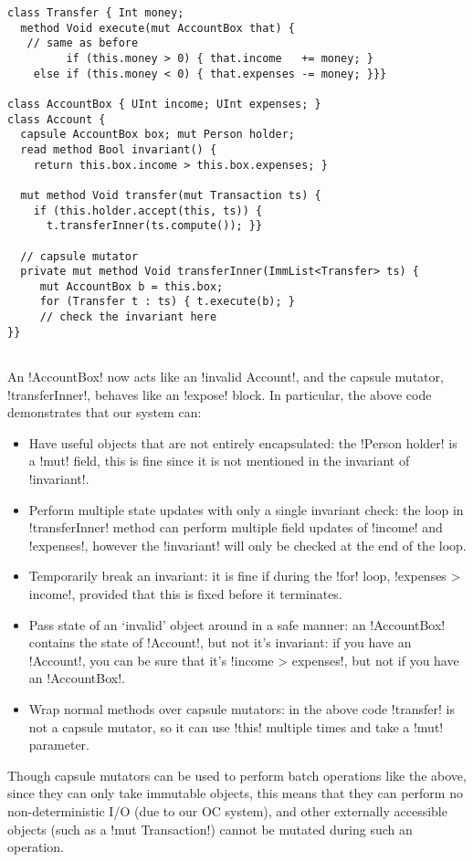 \begin{lstlisting}
class Transfer { Int money;
  method Void execute(mut AccountBox that) {
   // same as before
         if (this.money > 0) { that.income   += money; }
    else if (this.money < 0) { that.expenses -= money; }}}

class AccountBox { UInt income; UInt expenses; }
class Account {
  capsule AccountBox box; mut Person holder;
  read method Bool invariant() {
    return this.box.income > this.box.expenses; }
    
  mut method Void transfer(mut Transaction ts) {
    if (this.holder.accept(this, ts)) {
	  t.transferInner(ts.compute()); }}

  // capsule mutator
  private mut method Void transferInner(ImmList<Transfer> ts) {
     mut AccountBox b = this.box;
     for (Transfer t : ts) { t.execute(b); }
     // check the invariant here
}}
     
\end{lstlisting}
An \Q!AccountBox! now acts like an \Q!invalid Account!, and the capsule mutator, \Q!transferInner!, behaves like an \Q!expose! block. In particular, the above code demonstrates that our system can:
\begin{itemize}
\item Have useful objects that are not entirely encapsulated: the \Q!Person holder! is a \Q!mut! field, this is fine since it is not mentioned in the invariant of \Q!invariant!.
\item Perform multiple state updates with only a single invariant check: the loop in \Q!transferInner! method can perform multiple field updates of \Q!income! and \Q!expenses!, however the \Q!invariant! will only be checked at the end of the loop.
\item Temporarily break an invariant: it is fine if during the \Q!for! loop, \Q!expenses > income!, provided that this is fixed before it terminates.
\item Pass state of an `invalid' object around in a safe manner: an \Q!AccountBox! contains the state of \Q!Account!, but not it's invariant: if you have an \Q!Account!, you can be sure that it's \Q!income > expenses!, but not if you have an \Q!AccountBox!.
\item Wrap normal methods over capsule mutators: in the above code \Q!transfer! is not a capsule mutator, so it can use \Q!this! multiple times and take a \Q!mut! parameter.
\end{itemize}

Though capsule mutators can be used to perform batch operations like the above, since they can only take immutable objects, this means that they can perform no non-deterministic I/O (due to our OC system), and other externally accessible objects (such as a \Q!mut Transaction!) cannot be mutated during such an operation.

